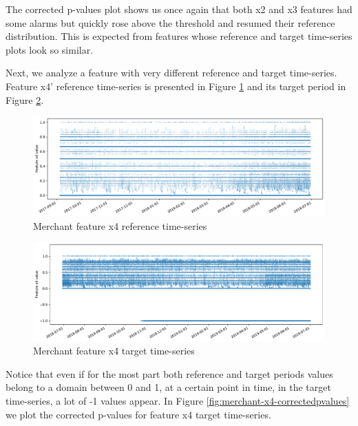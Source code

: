 The corrected p-values plot shows us once again that both x2 and x3 features had some alarms but quickly rose above the threshold and resumed their reference distribution. This is expected from features whose reference and target time-series plots look so similar.

Next, we analyze a feature with very different reference and target time-series. Feature x4' reference time-series is presented in Figure \ref{fig:merchant-x4-reference} and its target period in Figure \ref{fig:merchant-x4-target}.
\begin{figure}[!htb]
    \begin{center}
      \includegraphics[scale=0.5]{figures/merchant-x4-reference.pdf}
      \caption{Merchant feature x4 reference time-series}
      \label{fig:merchant-x4-reference}
    \end{center}
\end{figure}
\begin{figure}[!htb]
    \begin{center}
      \includegraphics[scale=0.5]{figures/merchant-x4-target.pdf}
      \caption{Merchant feature x4 target time-series}
      \label{fig:merchant-x4-target}
    \end{center}
\end{figure}
Notice that even if for the most part both reference and target periods values belong to a domain between 0 and 1, at a certain point in time, in the target time-series, a lot of -1 values appear. In Figure \ref{fig:merchant-x4-correctedpvalues} we plot the corrected p-values for feature x4 target time-series.
